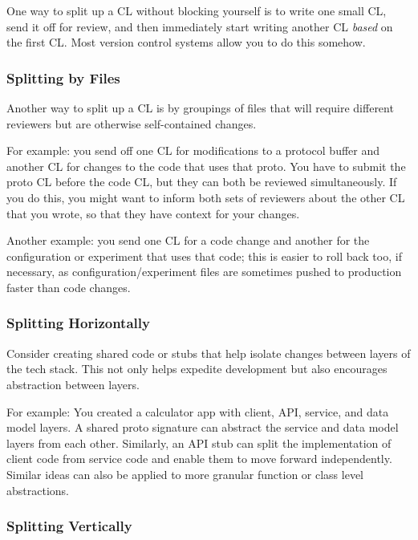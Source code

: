 \documentclass[
]{article}
\begin{document}
One way to split up a CL without blocking yourself is to write one small
CL, send it off for review, and then immediately start writing another
CL \emph{based} on the first CL. Most version control systems allow you
to do this somehow.

\subsubsection{Splitting by Files}\label{splitting-files}

Another way to split up a CL is by groupings of files that will require
different reviewers but are otherwise self-contained changes.

For example: you send off one CL for modifications to a protocol buffer
and another CL for changes to the code that uses that proto. You have to
submit the proto CL before the code CL, but they can both be reviewed
simultaneously. If you do this, you might want to inform both sets of
reviewers about the other CL that you wrote, so that they have context
for your changes.

Another example: you send one CL for a code change and another for the
configuration or experiment that uses that code; this is easier to roll
back too, if necessary, as configuration/experiment files are sometimes
pushed to production faster than code changes.

\subsubsection{Splitting Horizontally}\label{splitting-horizontally}

Consider creating shared code or stubs that help isolate changes between
layers of the tech stack. This not only helps expedite development but
also encourages abstraction between layers.

For example: You created a calculator app with client, API, service, and
data model layers. A shared proto signature can abstract the service and
data model layers from each other. Similarly, an API stub can split the
implementation of client code from service code and enable them to move
forward independently. Similar ideas can also be applied to more
granular function or class level abstractions.

\subsubsection{Splitting Vertically}\label{splitting-vertically}
\end{document}
